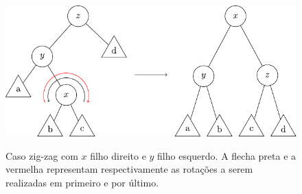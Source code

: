 


\begin{figure}[h]
    \centering
    \includegraphics{images/zigzag.pdf}
    \label{fig:zigzag}

\caption{Caso zig-zag com $x$ filho direito e $y$ filho esquerdo. A flecha preta e a vermelha representam respectivamente as rotações a serem realizadas em primeiro e por último.}
\end{figure}
